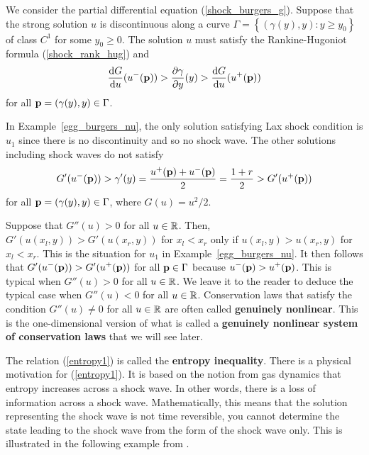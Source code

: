 \begin{defn} \label{LSCdef1}
We consider the partial differential equation (\ref{shock_burgers_g}).
Suppose that the strong solution $u$ is discontinuous along a curve
$\Gamma = \left\{ (\gamma(y),y) : y \geq y_0\right\}$ of class
$\displaystyle C^1$ for some $y_0 \geq 0$.  The solution $u$
must satisfy the Rankine-Hugoniot formula (\ref{shock_rank_hug}) and
\begin{equation} \label{entropy1}
\frac{\mathrm{d}G}{\mathrm{d}{u}}(u^-(\mathbf{p})) > \frac{\partial{\gamma}}{\partial y}(y) > \frac{\mathrm{d}G}{\mathrm{d}{u}}(u^+(\mathbf{p}))
\end{equation}
for all $\mathbf{p}=(\gamma(y),y) \in \Gamma$.
\end{defn}

In Example~\ref{egg_burgers_nu}, the only solution satisfying Lax
shock condition is $u_1$ since there is no discontinuity and so no
shock wave.  The other solutions including shock waves do not satisfy
\[
G'(u^-(\mathbf{p})) > \gamma'(y)
= \frac{u^+(\mathbf{p}) + u^-(\mathbf{p})}{2} = \frac{1+r}{2} > G'(u^+(\mathbf{p}))
\]
for all $\mathbf{p}=(\gamma(y),y) \in \Gamma$, where
$\displaystyle G(u) = u^2/2$.

Suppose that $G''(u) > 0$ for all $u \in \mathbb{R}$.  Then,
$G'(u(x_l,y)) > G'(u(x_r,y))$ for $x_l < x_r$ only if
$u(x_l,y) > u(x_r,y)$ for $x_l < x_r$.  This is the situation for
$u_1$ in Example~\ref{egg_burgers_nu}.  It then follows that
$\displaystyle G'(u^-(\mathbf{p})) > G'(u^+(\mathbf{p}))$ for all $\mathbf{p} \in \Gamma$
because $\displaystyle u^-(\mathbf{p}) > u^+(\mathbf{p})$.
This is typical when $G''(u) > 0$ for all $u \in \mathbb{R}$.  We leave it to
the reader to deduce the typical case when $G''(u) < 0$ for all $u \in \mathbb{R}$.
Conservation laws that satisfy the condition $G''(u) \neq 0$ for all
$u\in \mathbb{R}$ are often called
{\bfseries genuinely nonlinear}.
This is the one-dimensional version of what is called a
{\bfseries genuinely nonlinear system of conservation
laws} that we will see later.

The relation (\ref{entropy1}) is called the
{\bfseries entropy inequality}.
There is a physical motivation for (\ref{entropy1}).  It is based on
the notion from gas dynamics that entropy increases across a shock
wave.  In other words, there is a loss of information across a shock
wave.  Mathematically, this means that the solution representing the
shock wave is not time reversible, you cannot determine the state
leading to the shock wave from the form of the shock wave only. 
This is illustrated in the following example from \cite{Smo}.


